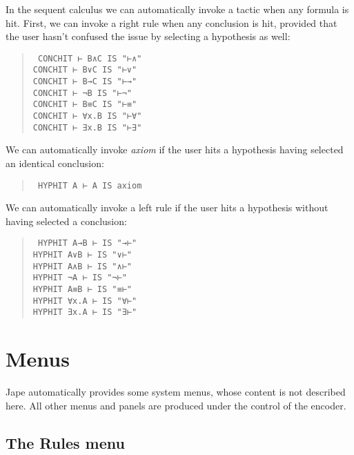 In the sequent calculus we can automatically invoke a tactic when any formula is hit. First, we can invoke a right rule when any conclusion is hit, provided that the user hasn't confused the issue by selecting a hypothesis as well:
\begin{quote}\tt\small
CONCHIT ⊢ B∧C   IS "⊢∧"\\
CONCHIT ⊢ B∨C   IS "⊢∨"      \\
CONCHIT ⊢ B→C   IS "⊢→"\\
CONCHIT ⊢ ¬B        IS "⊢¬"       \\
CONCHIT ⊢ B≡C   IS "⊢≡"     \\
CONCHIT ⊢ ∀x.B  IS "⊢∀"  \\
CONCHIT ⊢ ∃x.B  IS "⊢∃"  
\end{quote}

We can automatically invoke \textit{axiom} if the user hits a hypothesis having selected an identical conclusion:
\begin{quote}\tt\small
HYPHIT  A ⊢ A   IS axiom       
\end{quote}

We can automatically invoke a left rule if the user hits a hypothesis without having selected a conclusion:
\begin{quote}\tt\small
HYPHIT  A→B ⊢   IS "→⊢"        \\
HYPHIT  A∨B ⊢   IS "∨⊢"\\
HYPHIT  A∧B ⊢   IS "∧⊢"    \\
HYPHIT  ¬A ⊢        IS "¬⊢"    \\
HYPHIT  A≡B ⊢   IS "≡⊢"    \\
HYPHIT  ∀x.A ⊢  IS "∀⊢"\\
HYPHIT  ∃x.A ⊢  IS "∃⊢"
\end{quote}

\section{Menus}

Jape automatically provides some system menus, whose content is not described here. All other menus and panels are produced under the control of the encoder.

\subsection{The Rules menu}


